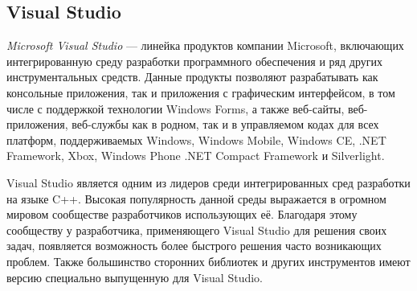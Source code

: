 \subsection{Visual Studio}
\label{sub:env_description:vs}
\textit{Microsoft Visual Studio} — линейка продуктов компании Microsoft, включающих интегрированную среду разработки программного обеспечения и ряд других инструментальных средств. Данные продукты позволяют разрабатывать как консольные приложения, так и приложения с графическим интерфейсом, в том числе с поддержкой технологии Windows Forms, а также веб-сайты, веб-приложения, веб-службы как в родном, так и в управляемом кодах для всех платформ, поддерживаемых Windows, Windows Mobile, Windows CE, .NET Framework, Xbox, Windows Phone .NET Compact Framework и Silverlight.

Visual Studio является одним из лидеров среди интегрированных сред разработки на языке C++. Высокая популярность данной среды выражается в огромном мировом сообществе разработчиков использующих её. Благодаря этому сообществу у разработчика, применяющего Visual Studio для решения своих задач, появляется возможность более быстрого решения часто возникающих проблем. Также большинство сторонних библиотек и других инструментов имеют версию специально выпущенную для Visual Studio.

